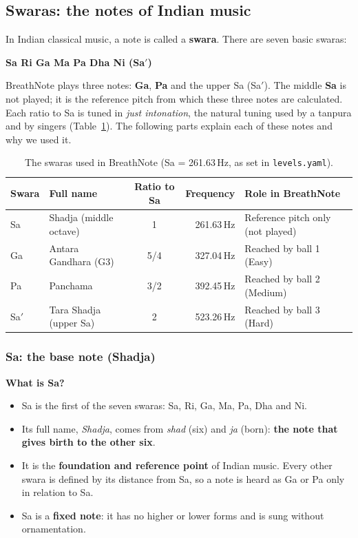 \documentclass[12pt,a4paper]{article}
\newcommand{\Sah}{Sa\ensuremath{'}}     %
\begin{document}
\subsection{Swaras: the notes of Indian music}
\label{sec:swaras}

In Indian classical music, a note is called a \textbf{swara}. There are seven basic swaras:
\begin{center}
\textbf{Sa \quad Ri \quad Ga \quad Ma \quad Pa \quad Dha \quad Ni \quad (\Sah)}
\end{center}
BreathNote plays three notes: \textbf{Ga}, \textbf{Pa} and the upper Sa (\Sah). The middle \textbf{Sa} is not played; it is the reference pitch from which these three notes are calculated. Each ratio to Sa is tuned in \emph{just intonation}, the natural tuning used by a tanpura and by singers (Table~\ref{tab:freq}). The following parts explain each of these notes and why we used it.

\begin{table}[H]
\centering
\caption{The swaras used in BreathNote (Sa = 261.63\,Hz, as set in \texttt{levels.yaml}).}
\label{tab:freq}
\small
\begin{tabular}{@{}l l c r l@{}}
\toprule
\textbf{Swara} & \textbf{Full name} & \textbf{Ratio to Sa} & \textbf{Frequency} & \textbf{Role in BreathNote} \\
\midrule
Sa   & Shadja (middle octave) & 1     & 261.63\,Hz & Reference pitch only (not played) \\
Ga   & Antara Gandhara (G3)   & 5/4   & 327.04\,Hz & Reached by ball 1 (Easy) \\
Pa   & Panchama               & 3/2   & 392.45\,Hz & Reached by ball 2 (Medium) \\
\Sah & Tara Shadja (upper Sa) & 2     & 523.26\,Hz & Reached by ball 3 (Hard) \\
\bottomrule
\end{tabular}
\end{table}

\subsubsection{Sa: the base note (Shadja)}
\textbf{What is Sa?}
\begin{itemize}
  \item Sa is the first of the seven swaras: Sa, Ri, Ga, Ma, Pa, Dha and Ni.
  \item Its full name, \emph{Shadja}, comes from \emph{shad} (six) and \emph{ja} (born): \textbf{the note that gives birth to the other six}.
  \item It is the \textbf{foundation and reference point} of Indian music. Every other swara is defined by its distance from Sa, so a note is heard as Ga or Pa only in relation to Sa.
  \item Sa is a \textbf{fixed note}: it has no higher or lower forms and is sung without ornamentation.
\end{itemize}
\end{document}
